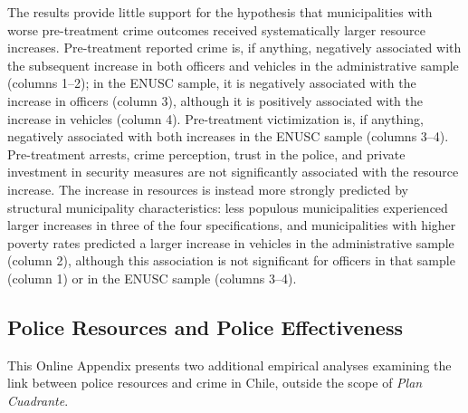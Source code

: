 The results provide little support for the hypothesis that municipalities with worse pre-treatment crime outcomes received systematically larger resource increases. Pre-treatment reported crime is, if anything, negatively associated with the subsequent increase in both officers and vehicles in the administrative sample (columns 1--2); in the ENUSC sample, it is negatively associated with the increase in officers (column 3), although it is positively associated with the increase in vehicles (column 4). Pre-treatment victimization is, if anything, negatively associated with both increases in the ENUSC sample (columns 3--4). Pre-treatment arrests, crime perception, trust in the police, and private investment in security measures are not significantly associated with the resource increase. The increase in resources is instead more strongly predicted by structural municipality characteristics: less populous municipalities experienced larger increases in three of the four specifications, and municipalities with higher poverty rates predicted a larger increase in vehicles in the administrative sample (column 2), although this association is not significant for officers in that sample (column 1) or in the ENUSC sample (columns 3--4).



\clearpage

\subsection{Police Resources and Police Effectiveness}
\label{resources_vs_specialization}

This Online Appendix presents two additional empirical analyses examining the link between police resources and crime in Chile, outside the scope of \emph{Plan Cuadrante}.

